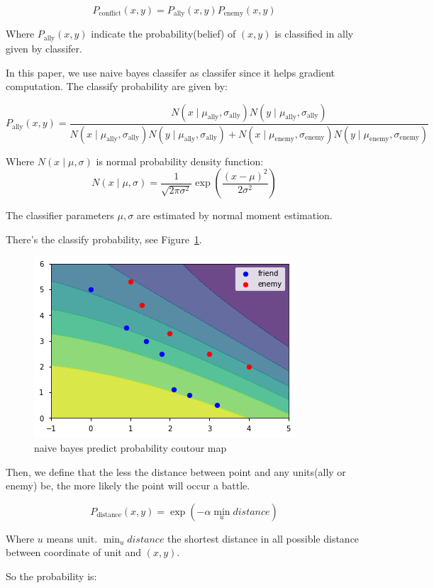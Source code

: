 \documentclass{article}
\begin{document}
$$
P_{\text{conflict}}(x,y) = P_\text{ally}(x,y) P_\text{enemy}(x,y)
$$

Where $P_\text{ally}(x,y)$ indicate the probability(belief) of $(x,y)$ is classified 
in ally given by classifer.

In this paper, we use naive bayes classifer as classifer since it helps gradient computation. The 
classify probability are given by:

$$
P_\text{ally}(x,y) = \frac{
N(x\mid \mu_\text{ally} ,\sigma_\text{ally}) N(y  \mid \mu_\text{ally}, \sigma_\text{ally})
}{
N(x \mid \mu_\text{ally} , \sigma_\text{ally}) N(y \mid \mu_\text{ally} , \sigma_\text{ally}) + 
N(x \mid \mu_\text{enemy} , \sigma_\text{enemy}) N(y \mid \mu_\text{enemy} , \sigma_\text{enemy})
}
$$

Where $N(x \mid \mu,\sigma)$ is normal probability density function:
$$
N(x \mid \mu,\sigma) = \frac{1}{\sqrt{2\pi \sigma^2}} \exp\left(\frac{(x-\mu)^2}{2\sigma^2}\right)
$$

The classifier parameters $\mu,\sigma$ are estimated by normal moment estimation.

There's the classify probability, see Figure~\ref{fig:naivebayes}.

\begin{figure}[h]
\includegraphics[width=0.6\linewidth]{naivebayes.png}
\caption{naive bayes predict probability coutour map}
\label{fig:naivebayes}
\end{figure}

Then, we define that the less the distance between point and any units(ally or enemy) be,
the more likely the point will occur a battle.

$$
P_{\text{distance}}(x,y) = \exp(-\alpha \min_{u} distance)
$$

Where $u$ means unit. $\min_u distance$ the shortest distance in all possible distance 
between coordinate of unit and $(x,y)$.

So the probability is:
\end{document}
